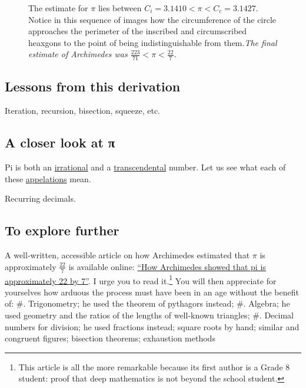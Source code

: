 \documentclass[
  a4paper,
]{article}
\begin{document}
\begin{figure}
\centering

\caption{The estimate for \(\pi\) lies between
\(C_i = 3.1410 < \pi < C_c = 3.1427\). Notice in this sequence of images
how the circumference of the circle approaches the perimeter of the
inscribed and circumscribed heaxgons to the point of being
indistinguishable from them.\emph{The final estimate of Archimedes was
\(\frac{223}{71} < \pi < \frac{22}{7}\).}}\label{fig:ninety-six-gon}
\end{figure}

\subsection{Lessons from this
derivation}\label{lessons-from-this-derivation}

Iteration, recursion, bisection, squeeze, etc.

\subsection{A closer look at π}\label{a-closer-look-at-ux3c0}

Pi is both an
\href{https://en.wikipedia.org/wiki/Irrational_number}{irrational} and a
\href{https://en.wikipedia.org/wiki/Transcendental_number}{transcendental}
number. Let us see what each of these
\href{https://www.merriam-webster.com/dictionary/appellation}{appelations}
mean.

Recurring decimals.

\subsection{To explore further}\label{to-explore-further}

A well-written, accessible article on how Archimedes estimated that
\(\pi\) is approximately \(\frac{22}{7}\) is available online:
\href{https://publications.azimpremjiuniversity.edu.in/3356/1/02-DaminiAndAbhishek_PiIs22By7_Final.pdf}{``How
Archimedes showed that pi is approximately 22 by 7''}. I urge you to
read it.\footnote{This article is all the more remarkable because its
  first author is a Grade 8 student: proof that deep mathematics is not
  beyond the school student.} You will then appreciate for yourselves
how arduous the process must have been in an age without the benefit of:
\#. Trigonometry; he used the theorem of pythagors instead; \#. Algebra;
he used geometry and the ratios of the lengths of well-known triangles;
\#. Decimal numbers for division; he used fractions instead; square
roots by hand; similar and congruent figures; bisection theorems;
exhaustion methods
\end{document}
